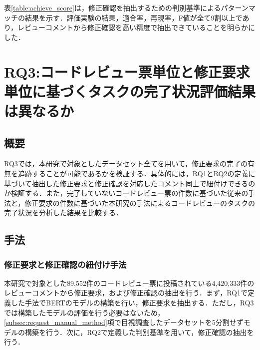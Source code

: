 \documentclass[11pt]{jreport}
\newcommand{\RQThree}{コードレビュー票単位と修正要求単位に基づくタスクの完了状況評価結果は異なるか}
\begin{document}
表\ref{table:achieve_score}は，修正確認を抽出するための判別基準によるパターンマッチの結果を示す．評価実験の結果，適合率，再現率，F値が全て9割以上であり，レビューコメントから修正確認を高い精度で抽出できていることを明らかにした．

\begin{table}[t]
\centering
  \caption{修正確認コメントの予測精度}
  \label{table:achieve_score}
\end{table}

\chapter{RQ3:\RQThree}\label{chap:RQ3}

\section{概要}
RQ3では，本研究で対象としたデータセット全てを用いて，修正要求の完了の有無を追跡することが可能であるかを検証する．具体的には，RQ1とRQ2の定義に基づいて抽出した修正要求と修正確認を対応したコメント同士で紐付けできるのか検証する．また，完了していないコードレビュー票の件数に基づいた従来の手法と，修正要求の件数に基づいた本研究の手法によるコードレビューのタスクの完了状況を分析した結果を比較する．

\section{手法}
\subsection{修正要求と修正確認の紐付け手法}\label{subsec:link_method}
本研究で対象とした89,552件のコードレビュー票に投稿されている4,420,333件のレビューコメントから修正要求，および修正確認の抽出を行う．まず，RQ1で定義した手法でBERTのモデルの構築を行い，修正要求を抽出する．ただし，RQ3では構築したモデルの評価を行う必要はないため，\ref{subsec:request_manual_method}項で目視調査したデータセットを5分割せずモデルの構築を行う．次に，RQ2で定義した判別基準を用いて，修正確認の抽出を行う．
\end{document}
